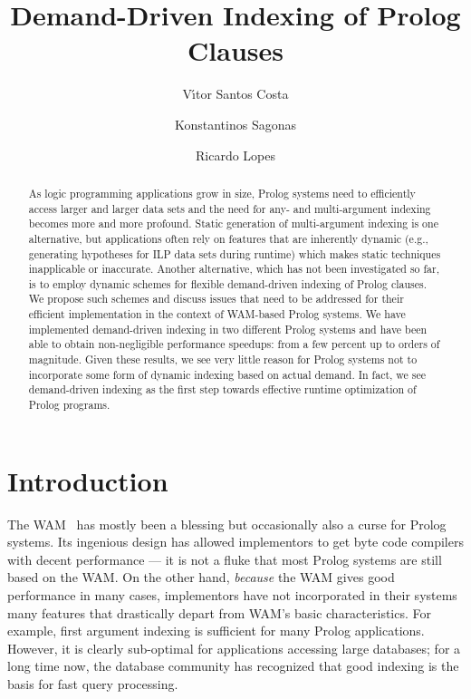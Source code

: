 \documentclass{llncs}
\title{Demand-Driven Indexing of Prolog Clauses}
\author{V\'{\i}tor Santos Costa\inst{1} \and Konstantinos
  Sagonas\inst{2} \and Ricardo Lopes\inst{1}}
\institute{
  University of Porto, Portugal
  \and
  National Technical University of Athens, Greece
}
\begin{document}
\maketitle

\begin{abstract}
  As logic programming applications grow in size, Prolog systems need
  to efficiently access larger and larger data sets and the need for
  any- and multi-argument indexing becomes more and more profound.
  Static generation of multi-argument indexing is one alternative, but
  applications often rely on features that are inherently dynamic
  (e.g., generating hypotheses for ILP data sets during runtime) which
  makes static techniques inapplicable or inaccurate. Another
  alternative, which has not been investigated so far, is to employ
  dynamic schemes for flexible demand-driven indexing of Prolog
  clauses. We propose such schemes and discuss issues that need to be
  addressed for their efficient implementation in the context of
  WAM-based Prolog systems. We have implemented demand-driven indexing
  in two different Prolog systems and have been able to obtain
  non-negligible performance speedups: from a few percent up to orders
  of magnitude. Given these results, we see very little reason for
  Prolog systems not to incorporate some form of dynamic indexing
  based on actual demand. In fact, we see demand-driven indexing as
  the first step towards effective runtime optimization of Prolog
  programs.
\end{abstract}


\section{Introduction}
The WAM~\cite{Warren83} has mostly been a blessing but occasionally
also a curse for Prolog systems. Its ingenious design has allowed
implementors to get byte code compilers with decent performance --- it
is not a fluke that most Prolog systems are still based on the WAM. On
the other hand, \emph{because} the WAM gives good performance in many
cases, implementors have not incorporated in their systems many
features that drastically depart from WAM's basic characteristics.
%
For example, first argument indexing is sufficient for many Prolog
applications. However, it is clearly sub-optimal for applications
accessing large databases; for a long time now, the database community
has recognized that good indexing is the basis for fast query
processing.
\end{document}
